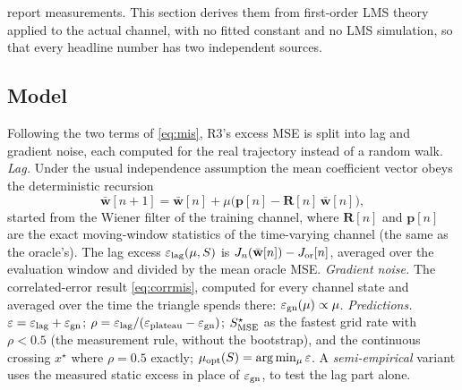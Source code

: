 \section{}
\label{sec:theory}
\begin{newtext}
 report measurements. This section derives them from first-order LMS theory applied to the actual channel, with no fitted constant and no LMS simulation, so that every headline number has two independent sources.

\subsection{Model}
Following the two terms of \eqref{eq:mis}, R3's excess MSE is split into lag and gradient noise, each computed for the real trajectory instead of a random walk.
\emph{Lag.} Under the usual independence assumption the mean coefficient vector obeys the deterministic recursion
\begin{equation}
\bar{\mathbf w}[n+1]=\bar{\mathbf w}[n]+\mu\big(\mathbf p[n]-\mathbf R[n]\,\bar{\mathbf w}[n]\big),
\label{eq:meanw}
\end{equation}
started from the Wiener filter of the training channel, where $\mathbf R[n]$ and $\mathbf p[n]$ are the exact moving-window statistics of the time-varying channel (the same as the oracle's). The lag excess $\varepsilon_{\rm lag}(\mu,S)$ is $J_n(\bar{\mathbf w}[n])-J_{\rm or}[n]$, averaged over the evaluation window and divided by the mean oracle MSE.
\emph{Gradient noise.} The correlated-error result \eqref{eq:corrmis}, computed for every channel state and averaged over the time the triangle spends there: $\varepsilon_{\rm gn}(\mu)\propto\mu$.
\emph{Predictions.} $\varepsilon=\varepsilon_{\rm lag}+\varepsilon_{\rm gn}$; $\rho=\varepsilon_{\rm lag}/(\varepsilon_{\rm plateau}-\varepsilon_{\rm gn})$; $S^\star_{\rm MSE}$ as the fastest grid rate with $\rho<0.5$ (the measurement rule, without the bootstrap), and the continuous crossing $x^\star$ where $\rho=0.5$ exactly; $\mu_{\rm opt}(S)=\arg\min_\mu\varepsilon$. A \emph{semi-empirical} variant uses the measured static excess in place of $\varepsilon_{\rm gn}$, to test the lag part alone.


\end{newtext}
